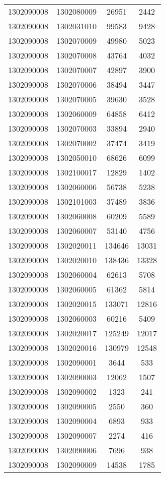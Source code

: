 \begin{longtable}[h]{llcc}
		1302090008 & 1302080009 & 26951 & 2442\\
		1302090008 & 1302031010 & 99583 & 9428\\
		1302090008 & 1302070009 & 49980 & 5023\\
		1302090008 & 1302070008 & 43764 & 4032\\
		1302090008 & 1302070007 & 42897 & 3900\\
		1302090008 & 1302070006 & 38494 & 3447\\
		1302090008 & 1302070005 & 39630 & 3528\\
		1302090008 & 1302060009 & 64858 & 6412\\
		1302090008 & 1302070003 & 33894 & 2940\\
		1302090008 & 1302070002 & 37474 & 3419\\
		1302090008 & 1302050010 & 68626 & 6099\\
		1302090008 & 1302100017 & 12829 & 1402\\
		1302090008 & 1302060006 & 56738 & 5238\\
		1302090008 & 1302101003 & 37489 & 3836\\
		1302090008 & 1302060008 & 60209 & 5589\\
		1302090008 & 1302060007 & 53140 & 4756\\
		1302090008 & 1302020011 & 134646 & 13031\\
		1302090008 & 1302020010 & 138436 & 13328\\
		1302090008 & 1302060004 & 62613 & 5708\\
		1302090008 & 1302060005 & 61362 & 5814\\
		1302090008 & 1302020015 & 133071 & 12816\\
		1302090008 & 1302060003 & 60216 & 5409\\
		1302090008 & 1302020017 & 125249 & 12017\\
		1302090008 & 1302020016 & 130979 & 12548\\
		1302090008 & 1302090001 & 3644 & 533\\
		1302090008 & 1302090003 & 12062 & 1507\\
		1302090008 & 1302090002 & 1323 & 241\\
		1302090008 & 1302090005 & 2550 & 360\\
		1302090008 & 1302090004 & 6893 & 933\\
		1302090008 & 1302090007 & 2274 & 416\\
		1302090008 & 1302090006 & 7696 & 938\\
		1302090008 & 1302090009 & 14538 & 1785\\

\end{longtable}
